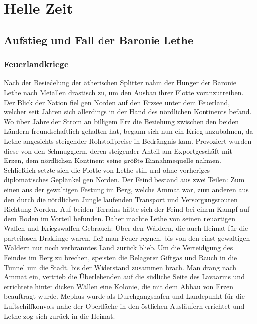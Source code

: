 \documentclass[a4paper,12pt,oneside]{book}
\begin{document}
\part{Helle Zeit}

\chapter{Aufstieg und Fall der Baronie Lethe}

\section{Feuerlandkriege}
Nach der Besiedelung der ätherischen Splitter nahm der Hunger der Baronie Lethe nach Metallen drastisch zu, um den Ausbau ihrer Flotte voranzutreiben. Der Blick der Nation fiel gen Norden auf den Erzsee unter dem Feuerland, welcher seit Jahren sich allerdings in der Hand des nördlichen Kontinents befand. Wo über Jahre der Strom an billigem Erz die Beziehung zwischen den beiden Ländern freundschaftlich gehalten hat, begann sich nun ein Krieg anzubahnen, da Lethe angesichts steigender Rohstoffpreise in Bedrängnis kam. Provoziert wurden diese von den Schmugglern, deren steigender Anteil am Exportgeschäft mit Erzen, dem nördlichen Kontinent seine größte Einnahmequelle nahmen. Schließlich setzte sich die Flotte von Lethe still und ohne vorheriges diplomatisches Geplänkel gen Norden. Der Feind bestand aus zwei Teilen: Zum einen aus der gewaltigen Festung im Berg, welche Ammat war, zum anderen aus den durch die nördlichen Jungle laufenden Transport und Versorgungsrouten Richtung Norden. Auf beiden Terrains hätte sich der Feind bei einem Kampf auf dem Boden im Vorteil befunden. Daher machte Lethe von seinen neuartigen Waffen und Kriegswaffen Gebrauch: Über den Wäldern, die auch Heimat für die parteilosen Draklinge waren, ließ man Feuer regnen, bis von den einst gewaltigen Wäldern nur noch verbranntes Land zurück blieb. Um die Verteidigung des Feindes im Berg zu brechen, speisten die Belagerer Giftgas und Rauch in die Tunnel um die Stadt, bis der Widerstand zusammen brach. Man drang nach Ammat ein, vertrieb die Überlebenden auf die südliche Seite des Lavaarms und errichtete hinter dicken Wällen eine Kolonie, die mit dem Abbau von Erzen beauftragt wurde. Mephus wurde als Durchgangshafen und Landepunkt für die Luftschiffkonvois nahe der Oberfläche in den östlichen Ausläufern errichtet und Lethe zog sich zurück in die Heimat.
\end{document}
